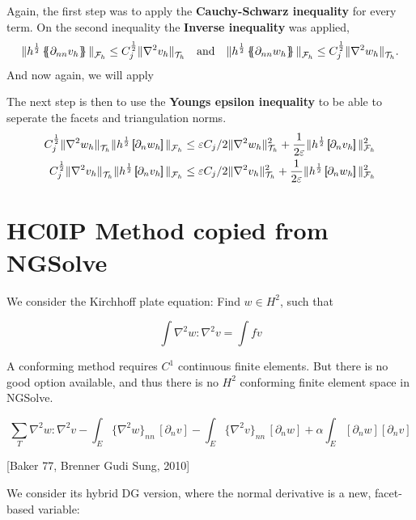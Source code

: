Again, the first step was to apply the \textbf{Cauchy-Schwarz inequality} for every term. On the second inequality the \textbf{Inverse inequality} was applied,
\[
\| h^{\frac{1}{2}} \mean{ \partial _{nn}v_{h} }   \|_{ \mathcal{F} _{h}  }^{  }\le   C_{j}^{\frac{1}{2}} \| \nabla ^2 v_{h} \|_{ \mathcal{T} _{h} }^{  } \quad \text{and} \quad   \| h^{\frac{1}{2}} \mean{ \partial _{nn}w_{h} }   \|_{ \mathcal{F} _{h}
}^{  }\le   C_{j}^{\frac{1}{2}} \| \nabla ^2 w_{h} \|_{ \mathcal{T} _{h} }^{  }.
\]
And now again, we will apply

The next step is then to use the \textbf{Youngs epsilon inequality} to be able to seperate the facets and triangulation norms. \[
    \begin{split}
   C^{\frac{1}{2}}_{j} \|  \nabla ^2 w_{h}    \|_{ \mathcal{T} _{h}  }^{  } \| h^{\frac{1}{2}} \jump{ \partial _{n} w_{h} }   \|_{ \mathcal{F} _{h} }^{  }  & \le \varepsilon C_{j}/2 \| \nabla ^2 w_{h} \|_{ \mathcal{T} _{h} }^{2  } +
   \frac{1}{2\varepsilon } \| h^{\frac{1}{2}} \jump{ \partial _{n} v_{h} }   \|_{ \mathcal{F} _{h} }^{2  } \\
   C^{\frac{1}{2}}_{j} \|  \nabla ^2 v_{h}    \|_{ \mathcal{T} _{h}  }^{  } \| h^{\frac{1}{2}} \jump{ \partial _{n} v_{h} }   \|_{ \mathcal{F} _{h} }^{  } &  \le \varepsilon C_{j}/2 \| \nabla ^2 v_{h} \|_{ \mathcal{T} _{h} }^{2  } +
 \frac{1}{2\varepsilon } \| h^{\frac{1}{2}} \jump{ \partial _{n} w_{h} }   \|_{ \mathcal{F} _{h} }^{2  }
\end{split}
\]

\section{HC0IP Method copied from NGSolve}%
\label{ssub:hc0ip_method_from_ngsolve}

We consider the Kirchhoff plate equation: Find $w \in H^2$, such that

$$
\int \nabla^2 w : \nabla^2 v = \int f v
$$

A conforming method requires $C^1$ continuous finite elements. But there is no good option available, and thus there is no $H^2$ conforming finite element space in NGSolve.

$$
\sum_T \nabla^2 w : \nabla^2 v
- \int_{E} \{\nabla^2 w\}_{nn} \, [\partial_n v]
- \int_{E} \{\nabla^2 v\}_{nn} \, [\partial_n w] + \alpha \int_E  [\partial_n w]  [\partial_n v]
$$

[Baker 77, Brenner Gudi Sung, 2010]

We consider its hybrid DG version, where the normal derivative is a new, facet-based variable:


